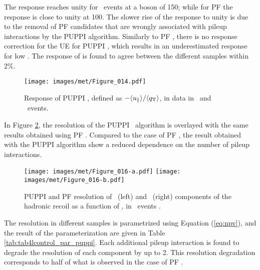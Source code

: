 The response reaches unity for \Zmm\ events at a boson \pt of 150\GeV; while for PF \ptmiss the response is close to unity at 100\GeV. 
The slower rise of the response to unity is due to the removal of PF candidates that are wrongly associated with pileup interactions by the PUPPI algorithm. 
Similarly to PF \ptmiss, there is no response correction for the UE for PUPPI \ptmiss, which results in an underestimated response for low \qt. 
The response of \ptmiss is found to agree between the different samples within 2\%. 
\begin{figure}[htbp!]
  \centering
   \texttt{[image: images/met/Figure\_014.pdf]}
  \caption{Response of PUPPI \ptmiss, defined as $-\langle u_\Vert \rangle /\langle {q}_{\mathrm T} \rangle$, in data in \Zmm\ and \Zee\ events. }
  \label{fig:response_puppi}
\end{figure}
\newpara
\noindent\justify
In Figure \ref{fig:Res_vs_PileUpHighPU}, the resolution of the PUPPI \ptmiss\ algorithm is overlayed with the same results obtained using PF \ptmiss. 
Compared to the case of PF \ptmiss, the result obtained with the PUPPI algorithm show a reduced dependence on the number of pileup interactions.
\begin{figure}[htbp!]
  \centering
   \texttt{[image: images/met/Figure\_016-a.pdf]}
   \texttt{[image: images/met/Figure\_016-b.pdf]}
   \caption{PUPPI and PF \ptmiss resolution of \upar\ (left) and \uperp\ (right) components of the hadronic recoil as a function of \nvtx, in \Zmm\ events \cite{Sirunyan:2019kia}.} 
   \label{fig:Res_vs_PileUpHighPU}
\end{figure}
The resolution in different samples is parametrized using Equation (\ref{eq:npv}), and the result of the parameterization are given in Table \ref{tab:tab4lcontrol_par_puppi}. 
Each additional pileup interaction is found to degrade the resolution of each component by up to 2\GeV. This resolution degradation corresponds to half of what is observed in the case of PF \ptmiss.
